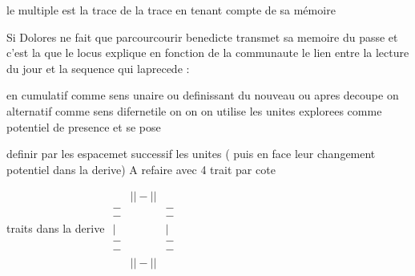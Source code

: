 \documentclass{article}
\begin{document}
le multiple est la trace de la trace  en tenant compte de sa mémoire 

Si Dolores ne fait que parcourcourir benedicte transmet sa memoire du passe 
 et c'est la que le locus  explique  en fonction de la communaute le lien entre la lecture du jour et la sequence qui laprecede :
 
 en cumulatif  comme sens unaire ou definissant du nouveau
 ou apres decoupe on alternatif comme sens difernetile  on on on utilise les unites explorees comme potentiel de presence et se pose 
 
 
 definir par les espacemet successif les unites ( puis en face leur changement potentiel dans la derive)
 A refaire avec 4 trait par cote
% 


traits dans la derive 
$\begin{matrix}
&||-||&\\
-&&-\\
-&&-\\
|&&|\\
-&&-\\
- &&-\\
&||-||&
\end{matrix}$
\end{document}

